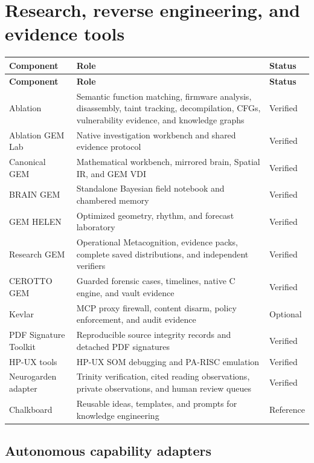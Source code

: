 \documentclass[11pt]{article}
\begin{document}
\clearpage
\section{Research, reverse engineering, and evidence tools}

\begin{longtable}{p{}p{}p{}}
\toprule
\textbf{Component} & \textbf{Role} & \textbf{Status}\\
\midrule
\endfirsthead
\toprule
\textbf{Component} & \textbf{Role} & \textbf{Status}\\
\midrule
\endhead
Ablation & Semantic function matching, firmware analysis, disassembly, taint tracking, decompilation, CFGs, vulnerability evidence, and knowledge graphs & Verified\\
Ablation GEM Lab & Native investigation workbench and shared evidence protocol & Verified\\
Canonical GEM & Mathematical workbench, mirrored brain, Spatial IR, and GEM VDI & Verified\\
BRAIN GEM & Standalone Bayesian field notebook and chambered memory & Verified\\
GEM HELEN & Optimized geometry, rhythm, and forecast laboratory & Verified\\
Research GEM & Operational Metacognition, evidence packs, complete saved distributions, and independent verifiers & Verified\\
CEROTTO GEM & Guarded forensic cases, timelines, native C engine, and vault evidence & Verified\\
Kevlar & MCP proxy firewall, content disarm, policy enforcement, and audit evidence & Optional\\
PDF Signature Toolkit & Reproducible source integrity records and detached PDF signatures & Verified\\
HP-UX tools & HP-UX SOM debugging and PA-RISC emulation & Verified\\
Neurogarden adapter & Trinity verification, cited reading observations, private observations, and human review queues & Verified\\
Chalkboard & Reusable ideas, templates, and prompts for knowledge engineering & Reference\\
\bottomrule
\end{longtable}

\subsection{Autonomous capability adapters}
\end{document}
